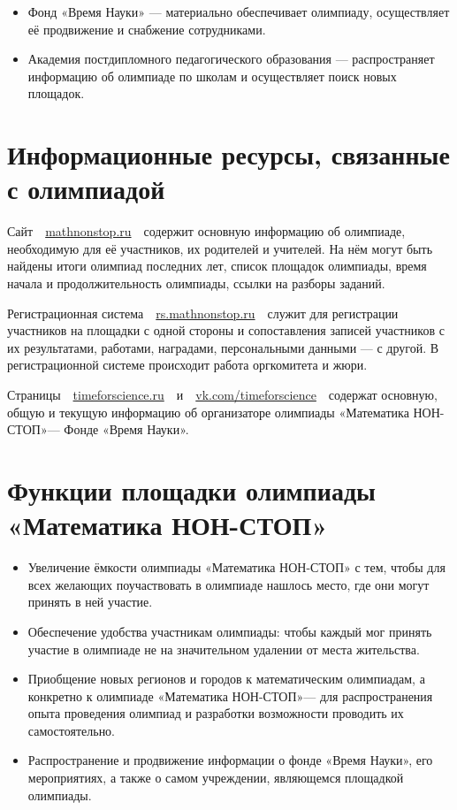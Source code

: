 \documentclass[a4paper,12pt]{article}
\newcommand{\mns}{«Математика НОН-СТОП»\xspace}
\begin{document}
\begin{itemize}
\item Фонд «Время Науки» — материально обеспечивает олимпиаду, осуществляет её продвижение и снабжение сотрудниками.

\item Академия постдипломного педагогического образования — распространяет информацию об олимпиаде по школам и осуществляет поиск новых площадок.
\end{itemize}

\section{Информационные ресурсы, связанные с олимпиадой}

Сайт\ \ \url{mathnonstop.ru}\ \ содержит основную информацию об олимпиаде, необходимую для её участников, их родителей и учителей. На нём могут быть найдены итоги олимпиад последних лет, список площадок олимпиады, время начала и продолжительность олимпиады, ссылки на разборы заданий.

Регистрационная система\ \ \url{rs.mathnonstop.ru}\ \ служит для регистрации участников на площадки с одной стороны и сопоставления записей участников с их результатами, работами, наградами, персональными данными — с другой. В регистрационной системе происходит работа оргкомитета и жюри.

Страницы\ \ \url{timeforscience.ru}\ \ и\ \ \url{vk.com/timeforscience}\ \ содержат основную, общую и текущую информацию об организаторе олимпиады \mns — Фонде «Время Науки».

\section{Функции площадки олимпиады \mns}

\begin{itemize}
	\item Увеличение ёмкости олимпиады \mns с тем, чтобы для всех желающих поучаствовать в олимпиаде нашлось место, где они могут принять в ней участие.
	\item Обеспечение удобства участникам олимпиады: чтобы каждый мог принять участие в олимпиаде не на значительном удалении от места жительства.
	\item Приобщение новых регионов и городов к математическим олимпиадам, а конкретно к олимпиаде \mns — для распространения опыта проведения олимпиад и разработки возможности проводить их самостоятельно.
	\item Распространение и продвижение информации о фонде «Время Науки», его мероприятиях, а также о самом учреждении, являющемся площадкой олимпиады.
\end{itemize}
\end{document}
